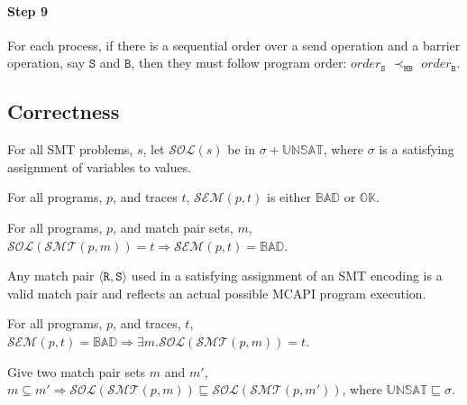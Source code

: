\paragraph*{Step 9} For each process, if there is a sequential order over a send operation and a barrier operation, say $\mathtt{S}$ and $\mathtt{B}$, then they must follow program order: 
$\mathit{order}_\mathtt{S}$
$\prec_\mathtt{HB}$ $\mathit{order}_\mathtt{B}$.

\subsection{Correctness}

\begin{definition}
For all SMT problems, $s$, let $\mathcal{SOL}(s)$ be in $\sigma +
\mathbb{UNSAT}$, where $\sigma$ is a satisfying assignment of
variables to values.
\end{definition}

\begin{definition}[Semantics]
For all programs, $p$, and traces $t$, $\mathcal{SEM}(p, t)$ is either
$\mathbb{BAD}$ or $\mathbb{OK}$.
\end{definition}

\begin{theorem}[Soundness]
For all programs, $p$, and match pair sets, $m$,
$\mathcal{SOL}(\mathcal{SMT}(p, m)) = t \Rightarrow \mathcal{SEM}(p, t) =
\mathbb{BAD}$.
\end{theorem}


\begin{lemma} \label{lem:bogus}
Any match pair $\langle \mathtt{R}, \mathtt{S}\rangle$ used in a
satisfying assignment of an SMT encoding is a valid match pair and
reflects an actual possible MCAPI program execution.
\end{lemma}

\begin{theorem}[Completeness]
For all programs, $p$, and traces, $t$, $\mathcal{SEM}(p, t) =
\mathbb{BAD} \Rightarrow \exists m . \mathcal{SOL}(\mathcal{SMT}(p,
m)) = t$.
\end{theorem}

\begin{theorem}[Approximation]
Give two match pair sets $m$ and $m'$, $m \subseteq m' \Rightarrow \mathcal{SOL}(\mathcal{SMT}(p, m))
  \sqsubseteq \mathcal{SOL}(\mathcal{SMT}(p, m'))$, where
  $\mathbb{UNSAT} \sqsubseteq \sigma$.
\end{theorem}


